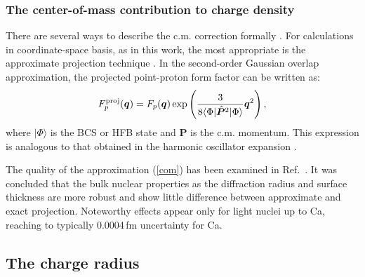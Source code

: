 \documentclass[aps,prc,twocolumn,floatfix,nofootinbib,preprintnumbers,superscriptaddress,longbibliography]{revtex4-1}
\renewcommand{\vec}{\boldsymbol}
\begin{document}
\subsubsection{The center-of-mass contribution to charge density}

There are several ways to describe the c.m.
correction formally \cite{Schmid1991,Mihaila1999,Hagen2009}. For calculations in coordinate-space basis, as in this work, the most appropriate is the approximate projection technique \cite{Schmid1991}. 
 In the second-order Gaussian overlap approximation, the projected
point-proton form factor can be written as:
\begin{equation}\label{com}
F_{p}^{\rm proj}(\vec{q})=    F_{p}(\vec{q})   \exp\left(\frac{3}{8\langle\Phi|\hat{\vec{P}}^2|\Phi\rangle}
     \vec{q}^2\right),
\end{equation}
where $|\Phi\rangle$ is the BCS or HFB state and $\vec{P}$ is the c.m. momentum. This  expression is analogous to that obtained in the 
harmonic oscillator expansion  \cite{Mihaila1999,Hagen2009}.

The quality of the approximation (\ref{com}) has been examined in
Ref.~\cite{Schmid1991}. It was concluded that the bulk nuclear 
properties as the diffraction radius and surface thickness are more
robust and show little difference between approximate and exact
projection. Noteworthy effects appear only for light nuclei up to Ca,
reaching to typically 0.0004\,fm uncertainty for Ca. 

\subsection{The charge  radius}
\end{document}
